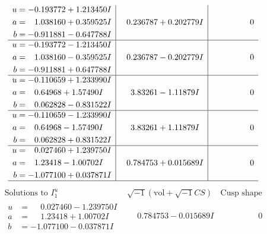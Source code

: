 \documentclass[1p]{elsarticle_modified}
\theoremstyle{definition}
\newcommand{\I}{\sqrt{-1}}
\begin{document}
$$\begin{array}{c|c|c}
\begin{aligned}
u &= -0.193772 + 1.213450 I \\
a &= \phantom{-}1.038160 + 0.359525 I \\
b &= -0.911881 - 0.647788 I\end{aligned}
 & \phantom{-}0.236787 + 0.202779 I & \phantom{-0.000000 } 0 \\ \hline\begin{aligned}
u &= -0.193772 - 1.213450 I \\
a &= \phantom{-}1.038160 - 0.359525 I \\
b &= -0.911881 + 0.647788 I\end{aligned}
 & \phantom{-}0.236787 - 0.202779 I & \phantom{-0.000000 } 0 \\ \hline\begin{aligned}
u &= -0.110659 + 1.233990 I \\
a &= \phantom{-}0.64968 + 1.57490 I \\
b &= \phantom{-}0.062828 - 0.831522 I\end{aligned}
 & \phantom{-}3.83261 - 1.11879 I & \phantom{-0.000000 } 0 \\ \hline\begin{aligned}
u &= -0.110659 - 1.233990 I \\
a &= \phantom{-}0.64968 - 1.57490 I \\
b &= \phantom{-}0.062828 + 0.831522 I\end{aligned}
 & \phantom{-}3.83261 + 1.11879 I & \phantom{-0.000000 } 0 \\ \hline\begin{aligned}
u &= \phantom{-}0.027460 + 1.239750 I \\
a &= \phantom{-}1.23418 - 1.00702 I \\
b &= -1.077100 + 0.037871 I\end{aligned}
 & \phantom{-}0.784753 + 0.015689 I & \phantom{-0.000000 } 0\\
 \hline 
 \end{array}$$\newpage$$\begin{array}{c|c|c}  
\text{Solutions to }I^u_{1}& \I (\text{vol} + \sqrt{-1}CS) & \text{Cusp shape}\\
 \hline 
\begin{aligned}
u &= \phantom{-}0.027460 - 1.239750 I \\
a &= \phantom{-}1.23418 + 1.00702 I \\
b &= -1.077100 - 0.037871 I\end{aligned}
 & \phantom{-}0.784753 - 0.015689 I & \phantom{-0.000000 } 0 \\ \hline\begin{aligned}

\end{aligned}
\end{array}$$
\end{document}
